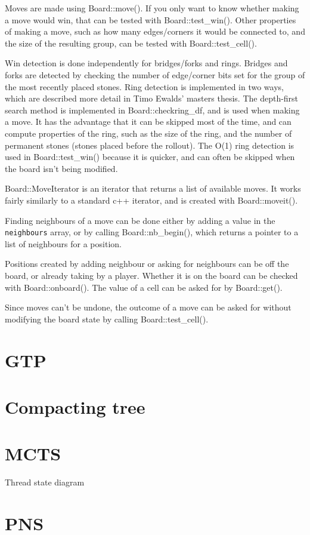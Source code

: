 \documentclass[12pt]{article}          %
\begin{document}
Moves are made using Board::move(). If you only want to know whether making a move would win, that can be tested with Board::test\_win(). Other properties of making a move, such as how many edges/corners it would be connected to, and the size of the resulting group, can be tested with Board::test\_cell().

Win detection is done independently for bridges/forks and rings. Bridges and forks are detected by checking the number of edge/corner bits set for the group of the most recently placed stones. Ring detection is implemented in two ways, which are described more detail in Timo Ewalds' masters thesis. The depth-first search method is implemented in Board::checkring\_df, and is used when making a move. It has the advantage that it can be skipped most of the time, and can compute properties of the ring, such as the size of the ring, and the number of permanent stones (stones placed before the rollout). The O(1) ring detection is used in Board::test\_win() because it is quicker, and can often be skipped when the board isn't being modified.

Board::MoveIterator is an iterator that returns a list of available moves. It works fairly similarly to a standard c++ iterator, and is created with Board::moveit().

Finding neighbours of a move can be done either by adding a value in the \texttt{neighbours} array, or by calling Board::nb\_begin(), which returns a pointer to a list of neighbours for a position.

Positions created by adding neighbour or asking for neighbours can be off the board, or already taking by a player. Whether it is on the board can be checked with Board::onboard(). The value of a cell can be asked for by Board::get().

Since moves can't be undone, the outcome of a move can be asked for without modifying the board state by calling Board::test\_cell().

\section{GTP}

\section{Compacting tree}

\section{MCTS}

Thread state diagram



\section{PNS}
\end{document}
